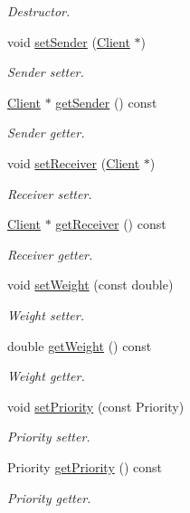 \begin{DoxyCompactItemize}
\begin{DoxyCompactList}\small\item\em Destructor. \end{DoxyCompactList}\item 
void \hyperlink{classPackage_a933801e98e91c1d540f9a47926bfc314}{set\+Sender} (\hyperlink{classClient}{Client} $\ast$)
\begin{DoxyCompactList}\small\item\em Sender setter. \end{DoxyCompactList}\item 
\hyperlink{classClient}{Client} $\ast$ \hyperlink{classPackage_a1e603126edbbd5c82c676eb0e6805554}{get\+Sender} () const 
\begin{DoxyCompactList}\small\item\em Sender getter. \end{DoxyCompactList}\item 
void \hyperlink{classPackage_a6a16574423734d7fd0aa4d5a74b0ad32}{set\+Receiver} (\hyperlink{classClient}{Client} $\ast$)
\begin{DoxyCompactList}\small\item\em Receiver setter. \end{DoxyCompactList}\item 
\hyperlink{classClient}{Client} $\ast$ \hyperlink{classPackage_a02e9aee9f9e10b6b6ba124df61bd289d}{get\+Receiver} () const 
\begin{DoxyCompactList}\small\item\em Receiver getter. \end{DoxyCompactList}\item 
void \hyperlink{classPackage_a0766f8a791e0b76d97671cb92d785496}{set\+Weight} (const double)
\begin{DoxyCompactList}\small\item\em Weight setter. \end{DoxyCompactList}\item 
double \hyperlink{classPackage_a2da083a8cab4c978c22c49ac46226aee}{get\+Weight} () const 
\begin{DoxyCompactList}\small\item\em Weight getter. \end{DoxyCompactList}\item 
void \hyperlink{classPackage_afe16b4fbff0a050019ddf47978001464}{set\+Priority} (const Priority)
\begin{DoxyCompactList}\small\item\em Priority setter. \end{DoxyCompactList}\item 
Priority \hyperlink{classPackage_accf52df9d08053e7c1c126d747e6beb0}{get\+Priority} () const 
\begin{DoxyCompactList}\small\item\em Priority getter. \end{DoxyCompactList}\end{DoxyCompactItemize}


